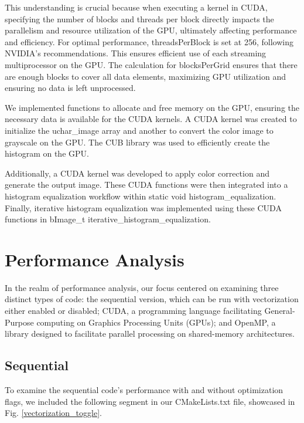 \documentclass[sigconf]{acmart}
\begin{document}
This understanding is crucial because when executing a kernel in CUDA, specifying the number of blocks and threads per block directly impacts the parallelism and resource utilization of the GPU, ultimately affecting performance and efficiency. For optimal performance, threadsPerBlock is set at 256, following NVIDIA's recommendations. This ensures efficient use of each streaming multiprocessor on the GPU. The calculation for blocksPerGrid ensures that there are enough blocks to cover all data elements, maximizing GPU utilization and ensuring no data is left unprocessed.

We implemented functions to allocate and free memory on the GPU, ensuring the necessary data is available for the CUDA kernels. A CUDA kernel was created to initialize the uchar\_image array and another to convert the color image to grayscale on the GPU. The CUB library was used to efficiently create the histogram on the GPU.

Additionally, a CUDA kernel was developed to apply color correction and generate the output image. These CUDA functions were then integrated into a histogram equalization workflow within static void histogram\_equalization. Finally, iterative histogram equalization was implemented using these CUDA functions in bImage\_t iterative\_histogram\_equalization.

\section{Performance Analysis}

In the realm of performance analysis, our focus centered on examining three distinct types of code: the sequential version, which can be run with vectorization either enabled or disabled; CUDA, a programming language facilitating General-Purpose computing on Graphics Processing Units (GPUs); and OpenMP, a library designed to facilitate parallel processing on shared-memory architectures. 

\subsection{Sequential}

To examine the sequential code's performance with and without optimization flags, we included the following segment in our CMakeLists.txt file, showcased in Fig. \ref{vectorization_toggle}.
\end{document}
